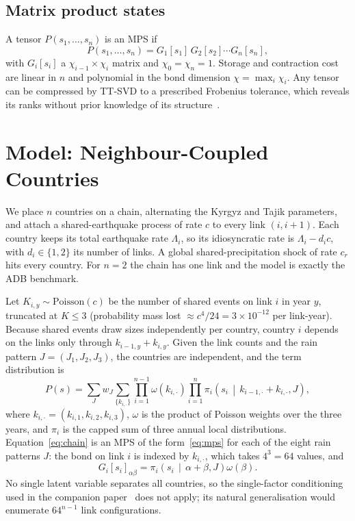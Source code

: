 \documentclass[conference]{IEEEtran}
\begin{document}
\subsection{Matrix product states}
A tensor $P(s_1,\dots,s_n)$ is an MPS if
\begin{equation}
P(s_1,\dots,s_n)=G_1[s_1]\,G_2[s_2]\cdots G_n[s_n],
\label{eq:mps}
\end{equation}
with $G_i[s_i]$ a $\chi_{i-1}\times\chi_i$ matrix and $\chi_0=\chi_n=1$. Storage and contraction cost are linear in
$n$ and polynomial in the bond dimension $\chi=\max_i\chi_i$. Any tensor can be compressed by TT-SVD to a prescribed
Frobenius tolerance, which reveals its ranks without prior knowledge of its structure~\cite{oseledets2011}.

\section{Model: Neighbour-Coupled Countries}\label{sec:model}
We place $n$ countries on a chain, alternating the Kyrgyz and Tajik parameters, and attach a shared-earthquake
process of rate $c$ to every link $(i,i+1)$. Each country keeps its total earthquake rate $\Lambda_i$, so its
idiosyncratic rate is $\Lambda_i-d_ic$, with $d_i\in\{1,2\}$ its number of links. A global shared-precipitation shock
of rate $c_r$ hits every country. For $n=2$ the chain has one link and the model is exactly the ADB benchmark.

Let $K_{i,y}\sim\mathrm{Poisson}(c)$ be the number of shared events on link $i$ in year $y$, truncated at $K\le3$
(probability mass lost $\approx c^{4}/24=3\times10^{-12}$ per link-year). Because shared events draw sizes
independently per country, country $i$ depends on the links only through $k_{i-1,y}+k_{i,y}$. Given the link counts
and the rain pattern $J=(J_1,J_2,J_3)$, the countries are independent, and the term distribution is
\begin{equation}
P(s)=\sum_{J}w_J\!\!\sum_{\{k_{i,\cdot}\}}\prod_{i=1}^{n-1}\omega(k_{i,\cdot})\prod_{i=1}^{n}\pi_i\!\left(s_i\,\middle|\,k_{i-1,\cdot}+k_{i,\cdot},J\right),
\label{eq:chain}
\end{equation}
where $k_{i,\cdot}=(k_{i,1},k_{i,2},k_{i,3})$, $\omega$ is the product of Poisson weights over the three years, and
$\pi_i$ is the capped sum of three annual local distributions. Equation~\eqref{eq:chain} is an MPS of the
form~\eqref{eq:mps} for each of the eight rain patterns $J$: the bond on link $i$ is indexed by $k_{i,\cdot}$, which
takes $4^{3}=64$ values, and
\begin{equation}
G_i[s_i]_{\alpha\beta}=\pi_i\!\left(s_i\,\middle|\,\alpha+\beta,J\right)\omega(\beta).
\end{equation}
No single latent variable separates all countries, so the single-factor conditioning used in the companion
paper~\cite{paper1} does not apply; its natural generalisation would enumerate $64^{n-1}$ link configurations.
\end{document}
